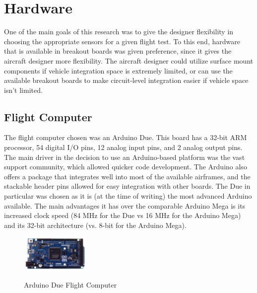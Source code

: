 \section{Hardware}
\label{hardware}
One of the main goals of this research was to give the designer flexibility in choosing the appropriate sensors for a given flight test. To this end, hardware that is available in breakout boards was given preference, since it gives the aircraft designer more flexibility. The aircraft designer could utilize surface mount components if vehicle integration space is extremely limited, or can use the available breakout boards to make circuit-level integration easier if vehicle space isn't limited.
\subsection*{Flight Computer}
The flight computer chosen was an Arduino Due. This board has a 32-bit ARM processor, 54 digital I/O pins, 12 analog input pins, and 2 analog output pins. The main driver in the decision to use an Arduino-based platform was the vast support community, which allowed quicker code development. The Arduino also offers a package that integrates well into most of the available airframes, and the stackable header pins allowed for easy integration with other boards. The Due in particular was chosen as it is (at the time of writing) the most advanced Arduino available. The main advantages it has over the comparable Arduino Mega is its increased clock speed (84 MHz for the Due\cite{Atmel2012} vs 16 MHz for the Arduino Mega\cite{Atmel2012atmega}) and its 32-bit architecture (vs. 8-bit for the Arduino Mega).
\begin{figure}[H]

  \centering
    \includegraphics[width=0.3\textwidth]{figures/arduinoDue.jpg}\  \caption{Arduino Due Flight Computer} \label{arduinoPicture}
\end{figure}


